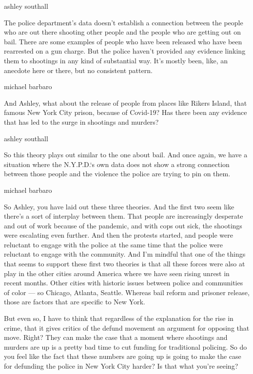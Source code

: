 ashley southall

The police department's data doesn't establish a connection between the
people who are out there shooting other people and the people who are
getting out on bail. There are some examples of people who have been
released who have been rearrested on a gun charge. But the police
haven't provided any evidence linking them to shootings in any kind of
substantial way. It's mostly been, like, an anecdote here or there, but
no consistent pattern.

michael barbaro

And Ashley, what about the release of people from places like Rikers
Island, that famous New York City prison, because of Covid-19? Has there
been any evidence that has led to the surge in shootings and murders?

ashley southall

So this theory plays out similar to the one about bail. And once again,
we have a situation where the N.Y.P.D.`s own data does not show a strong
connection between those people and the violence the police are trying
to pin on them.

michael barbaro

So Ashley, you have laid out these three theories. And the first two
seem like there's a sort of interplay between them. That people are
increasingly desperate and out of work because of the pandemic, and with
cops out sick, the shootings were escalating even further. And then the
protests started, and people were reluctant to engage with the police at
the same time that the police were reluctant to engage with the
community. And I'm mindful that one of the things that seems to support
these first two theories is that all these forces were also at play in
the other cities around America where we have seen rising unrest in
recent months. Other cities with historic issues between police and
communities of color --- so Chicago, Atlanta, Seattle. Whereas bail
reform and prisoner release, those are factors that are specific to New
York.

But even so, I have to think that regardless of the explanation for the
rise in crime, that it gives critics of the defund movement an argument
for opposing that move. Right? They can make the case that a moment
where shootings and murders are up is a pretty bad time to cut funding
for traditional policing. So do you feel like the fact that these
numbers are going up is going to make the case for defunding the police
in New York City harder? Is that what you're seeing?

